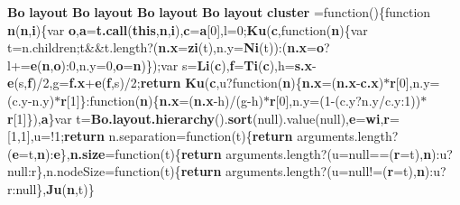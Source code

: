 \begin{DoxyCompactItemize}
\item 
{\bf Bo} {\bf layout} {\bf Bo} {\bf layout} {\bf Bo} {\bf layout} {\bf Bo} {\bf layout} {\bf cluster} =function()\{function {\bf n}({\bf n},{\bf i})\{var {\bf o},{\bf a}={\bf t.\+call}({\bf this},{\bf n},{\bf i}),{\bf c}={\bf a}[0],l=0;{\bf Ku}({\bf c},function({\bf n})\{var t=n.\+children;t\&\&t.\+length?({\bf n.\+x}={\bf zi}(t),n.\+y={\bf Ni}(t))\+:({\bf n.\+x}={\bf o}?l+={\bf e}({\bf n},{\bf o})\+:0,n.\+y=0,{\bf o}={\bf n})\});var s={\bf Li}({\bf c}),{\bf f}={\bf Ti}({\bf c}),h={\bf s.\+x}-\/{\bf e}(s,{\bf f})/2,g={\bf f.\+x}+{\bf e}({\bf f},s)/2;{\bf return} {\bf Ku}({\bf c},u?function({\bf n})\{{\bf n.\+x}=({\bf n.\+x}-\/{\bf c.\+x})$\ast${\bf r}[0],n.\+y=(c.\+y-\/n.\+y)$\ast${\bf r}[1]\}\+:function({\bf n})\{{\bf n.\+x}=({\bf n.\+x}-\/h)/(g-\/h)$\ast${\bf r}[0],n.\+y=(1-\/(c.\+y?n.\+y/c.\+y\+:1))$\ast${\bf r}[1]\}),{\bf a}\}var t={\bf Bo.\+layout.\+hierarchy}().{\bf sort}(null).value(null),{\bf e}={\bf wi},{\bf r}=[1,1],u=!1;{\bf return} n.\+separation=function(t)\{{\bf return} arguments.\+length?({\bf e}=t,{\bf n})\+:{\bf e}\},{\bf n.\+size}=function(t)\{{\bf return} arguments.\+length?(u=null==({\bf r}=t),{\bf n})\+:u?null\+:r\},n.\+node\+Size=function(t)\{{\bf return} arguments.\+length?(u=null!=({\bf r}=t),{\bf n})\+:u?r\+:null\},{\bf Ju}({\bf n},t)\}
\item 

\end{DoxyCompactItemize}
